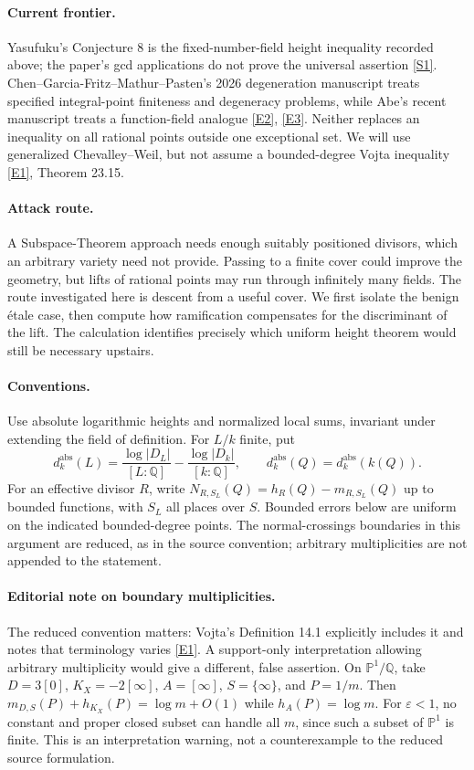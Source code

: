\documentclass[11pt,a4paper]{article}
\newcommand{\Q}{\mathbb{Q}}
\newcommand{\PP}{\mathbb P}
\newcommand{\eps}{\varepsilon}
\newcommand{\sref}[2]{\hyperlink{source:#1:#2}{[S#2]}}
\newcommand{\eref}[2]{\hyperlink{extra:#1:#2}{[E#2]}}
\numberwithin{equation}{section}
\begin{document}
\paragraph{Current frontier.}
Yasufuku's Conjecture 8 is the fixed-number-field height inequality recorded above; the paper's gcd applications do not prove the universal assertion \sref{30005098}{1}. Chen--Garcia-Fritz--Mathur--Pasten's 2026 degeneration manuscript treats specified integral-point finiteness and degeneracy problems, while Abe's recent manuscript treats a function-field analogue \eref{30005098}{2}, \eref{30005098}{3}. Neither replaces an inequality on all rational points outside one exceptional set. We will use generalized Chevalley--Weil, but not assume a bounded-degree Vojta inequality \eref{30005098}{1}, Theorem 23.15.

\paragraph{Attack route.}
A Subspace-Theorem approach needs enough suitably positioned divisors, which an arbitrary variety need not provide. Passing to a finite cover could improve the geometry, but lifts of rational points may run through infinitely many fields. The route investigated here is descent from a useful cover. We first isolate the benign étale case, then compute how ramification compensates for the discriminant of the lift. The calculation identifies precisely which uniform height theorem would still be necessary upstairs.

\paragraph{Conventions.}
Use absolute logarithmic heights and normalized local sums, invariant under extending the field of definition. For $L/k$ finite, put
\[
 d_k^{\mathrm{abs}}(L)=\frac{\log|D_L|}{[L:\Q]}-
                          \frac{\log|D_k|}{[k:\Q]},
 \qquad d_k^{\mathrm{abs}}(Q)=d_k^{\mathrm{abs}}(k(Q)).
\]
For an effective divisor $R$, write $N_{R,S_L}(Q)=h_R(Q)-m_{R,S_L}(Q)$ up to bounded functions, with $S_L$ all places over $S$. Bounded errors below are uniform on the indicated bounded-degree points. The normal-crossings boundaries in this argument are reduced, as in the source convention; arbitrary multiplicities are not appended to the statement.

\paragraph{Editorial note on boundary multiplicities.}
The reduced convention matters: Vojta's Definition 14.1 explicitly includes it and notes that terminology varies \eref{30005098}{1}. A support-only interpretation allowing arbitrary multiplicity would give a different, false assertion. On $\PP^1/\Q$, take $D=3[0]$, $K_X=-2[\infty]$, $A=[\infty]$, $S=\{\infty\}$, and $P=1/m$. Then $m_{D,S}(P)+h_{K_X}(P)=\log m+O(1)$ while $h_A(P)=\log m$. For $\eps<1$, no constant and proper closed subset can handle all $m$, since such a subset of $\PP^1$ is finite. This is an interpretation warning, not a counterexample to the reduced source formulation.
\end{document}
